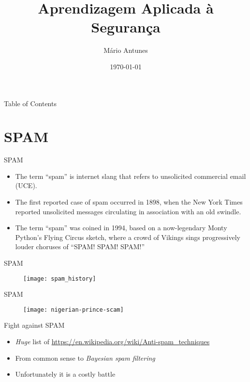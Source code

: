 \documentclass[hyperref={hidelinks}]{beamer}
\title{Aprendizagem Aplicada à Segurança}
\date{\today}
\author{Mário Antunes}
\institute{University of Aveiro}
\begin{document}
  \maketitle

  \begin{frame}{Table of Contents}
    \tableofcontents
  \end{frame}

  \section{SPAM}
  \begin{frame}{SPAM}
    \begin{itemize}
      \item The term ``spam'' is internet slang that refers to unsolicited commercial email (UCE).
      \item The first reported case of spam occurred in 1898, when the New York Times reported unsolicited messages circulating in association with an old swindle.
      \item The term ``spam'' was coined in 1994, based on a now-legendary Monty Python's Flying Circus sketch, where a crowd of Vikings sings progressively louder choruses of ``SPAM! SPAM! SPAM!''
    \end{itemize}
  \end{frame}

  \begin{frame}{SPAM}
    \begin{figure}
    \centering
    \texttt{[image: spam\_history]}
    \end{figure}
  \end{frame}

  \begin{frame}{SPAM}
    \begin{figure}
    \centering
    \texttt{[image: nigerian-prince-scam]}
    \end{figure}
  \end{frame}
  
  \begin{frame}{Fight against SPAM}
    \begin{itemize}
      \item \emph{Huge} list of \href{anti-spam techniques}{\url{https://en.wikipedia.org/wiki/Anti-spam_techniques}}
      \item From common sense to \emph{Bayesian spam filtering}
      \item Unfortunately it is a costly battle
    \end{itemize}
  \end{frame}
\end{document}
